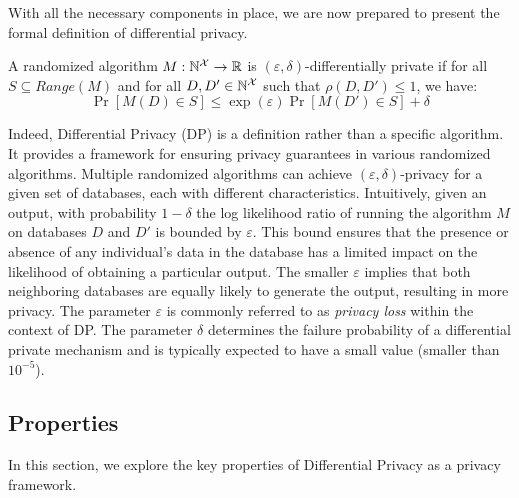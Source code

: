 With all the necessary components in place, we are now prepared to present the formal definition of differential privacy.
\begin{definition}
  A randomized algorithm $M: \mathbb{N}^\mathcal{X} \rightarrow \mathbb{R}$ is $(\varepsilon, \delta)$-differentially private if for all ${S} \subseteq Range(M)$ and for  all $D, D' \in \mathbb{N}^\mathcal{X}$ such that $\rho(D, D') \leq 1$, we have:
  \begin{equation*}
    \Pr[M(D) \in S] \leq \exp(\varepsilon)\Pr[M(D') \in S] + \delta
  \end{equation*}
\end{definition}
\noindent
Indeed, Differential Privacy (DP) is a definition rather than a specific algorithm.
It provides a framework for ensuring privacy guarantees in various randomized algorithms. Multiple randomized algorithms can achieve $(\varepsilon, \delta)$-privacy for a given set of databases, each with different characteristics. 
Intuitively, given an output, with probability $1-\delta$ the log likelihood ratio of running the algorithm $M$ on databases $D$ and $D'$ is bounded by $\varepsilon$.
This bound ensures that the presence or absence of any individual's data in the database has a limited impact on the likelihood of obtaining a particular output.
The smaller $\varepsilon$ implies that both neighboring databases are equally likely to generate the output, resulting in more privacy.
The parameter $\varepsilon$ is commonly referred to as \textit{privacy loss} within the context of DP.
The parameter $\delta$ determines the failure probability of a differential private mechanism and is typically expected to have a small value (\ie smaller than $10^{-5}$).


%
%

\subsection{Properties}\label{subsec:dp-properties}
In this section, we explore the key properties of Differential Privacy as a privacy framework.


